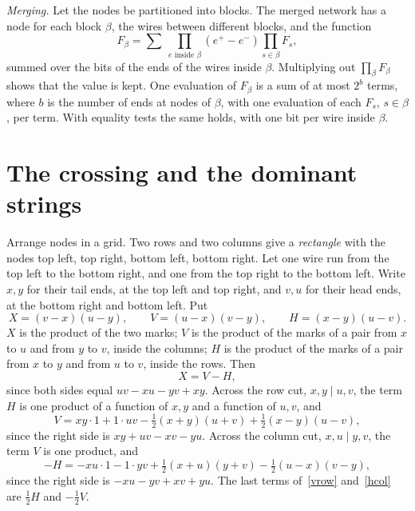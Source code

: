\documentclass[10pt]{article}
\begin{document}
\emph{Merging.} Let the nodes be partitioned into blocks. The merged network has a node for each block $\beta$, the wires between different blocks, and the function
\begin{equation}\label{merge}
F_\beta=\sum\ \prod_{e\text{ inside }\beta}(e^+-e^-)\prod_{s\in\beta}F_s,
\end{equation}
summed over the bits of the ends of the wires inside $\beta$. Multiplying out $\prod_\beta F_\beta$ shows that the value is kept. One evaluation of $F_\beta$ is a sum of at most $2^b$ terms, where $b$ is the number of ends at nodes of $\beta$, with one evaluation of each $F_s$, $s\in\beta$, per term. With equality tests the same holds, with one bit per wire inside $\beta$.

\section{The crossing and the dominant strings}

Arrange nodes in a grid. Two rows and two columns give a \emph{rectangle} with the nodes top left, top right, bottom left, bottom right. Let one wire run from the top left to the bottom right, and one from the top right to the bottom left. Write $x,y$ for their tail ends, at the top left and top right, and $v,u$ for their head ends, at the bottom right and bottom left. Put
\[
X=(v-x)(u-y),\qquad V=(u-x)(v-y),\qquad H=(x-y)(u-v).
\]
$X$ is the product of the two marks; $V$ is the product of the marks of a pair from $x$ to $u$ and from $y$ to $v$, inside the columns; $H$ is the product of the marks of a pair from $x$ to $y$ and from $u$ to $v$, inside the rows. Then
\begin{equation}\label{cross}
X=V-H,
\end{equation}
since both sides equal $uv-xu-yv+xy$. Across the row cut, $x,y\mid u,v$, the term $H$ is one product of a function of $x,y$ and a function of $u,v$, and
\begin{equation}\label{vrow}
V=xy\cdot1+1\cdot uv-\tfrac12(x+y)(u+v)+\tfrac12(x-y)(u-v),
\end{equation}
since the right side is $xy+uv-xv-yu$. Across the column cut, $x,u\mid y,v$, the term $V$ is one product, and
\begin{equation}\label{hcol}
-H=-xu\cdot1-1\cdot yv+\tfrac12(x+u)(y+v)-\tfrac12(u-x)(v-y),
\end{equation}
since the right side is $-xu-yv+xv+yu$. The last terms of~\eqref{vrow} and~\eqref{hcol} are $\frac12H$ and $-\frac12V$.
\end{document}
